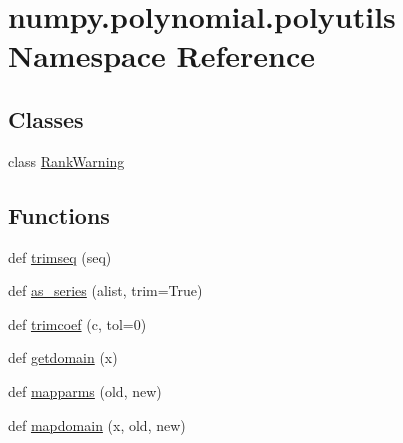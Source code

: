 \hypertarget{namespacenumpy_1_1polynomial_1_1polyutils}{}\section{numpy.\+polynomial.\+polyutils Namespace Reference}
\label{namespacenumpy_1_1polynomial_1_1polyutils}
\subsection*{Classes}
\begin{DoxyCompactItemize}
\item 
class \hyperlink{classnumpy_1_1polynomial_1_1polyutils_1_1RankWarning}{Rank\+Warning}
\end{DoxyCompactItemize}
\subsection*{Functions}
\begin{DoxyCompactItemize}
\item 
def \hyperlink{namespacenumpy_1_1polynomial_1_1polyutils_aea022dd7f5d8cfd3f8d165ba11f777ba}{trimseq} (seq)
\item 
def \hyperlink{namespacenumpy_1_1polynomial_1_1polyutils_ac8218044b08c2be42ae7c5e314dbe83d}{as\+\_\+series} (alist, trim=True)
\item 
def \hyperlink{namespacenumpy_1_1polynomial_1_1polyutils_a3c9e5301a8a54cc010e7c3bfee6fc674}{trimcoef} (c, tol=0)
\item 
def \hyperlink{namespacenumpy_1_1polynomial_1_1polyutils_a4a9585936f3fb9a6e0c297f9634984bf}{getdomain} (x)
\item 
def \hyperlink{namespacenumpy_1_1polynomial_1_1polyutils_a08c57061ab874647b21eb3faf330bd34}{mapparms} (old, new)
\item 
def \hyperlink{namespacenumpy_1_1polynomial_1_1polyutils_a5b4204c95349493afebe041e44a82585}{mapdomain} (x, old, new)
\end{DoxyCompactItemize}


